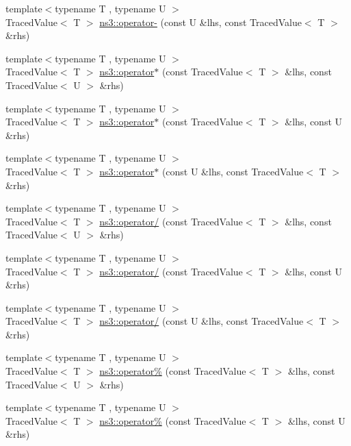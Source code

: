 \begin{DoxyCompactItemize}
\item 
{\footnotesize template$<$typename T , typename U $>$ }\\Traced\+Value$<$ T $>$ \hyperlink{group__tracing_gafaf9fc8dc508b1c51a5be851fb6aca0b}{ns3\+::operator-\/} (const U \&lhs, const Traced\+Value$<$ T $>$ \&rhs)
\item 
{\footnotesize template$<$typename T , typename U $>$ }\\Traced\+Value$<$ T $>$ \hyperlink{group__tracing_ga849d6e45a8026bcd4579e0700ce015ef}{ns3\+::operator$\ast$} (const Traced\+Value$<$ T $>$ \&lhs, const Traced\+Value$<$ U $>$ \&rhs)
\item 
{\footnotesize template$<$typename T , typename U $>$ }\\Traced\+Value$<$ T $>$ \hyperlink{group__tracing_ga735b4d1ce5c08bc715107f07ed933644}{ns3\+::operator$\ast$} (const Traced\+Value$<$ T $>$ \&lhs, const U \&rhs)
\item 
{\footnotesize template$<$typename T , typename U $>$ }\\Traced\+Value$<$ T $>$ \hyperlink{group__tracing_gac1cbedda6a22e93b898cc5b39e39e8da}{ns3\+::operator$\ast$} (const U \&lhs, const Traced\+Value$<$ T $>$ \&rhs)
\item 
{\footnotesize template$<$typename T , typename U $>$ }\\Traced\+Value$<$ T $>$ \hyperlink{group__tracing_ga5aa99ab0ba1592361e452c73ed91bc52}{ns3\+::operator/} (const Traced\+Value$<$ T $>$ \&lhs, const Traced\+Value$<$ U $>$ \&rhs)
\item 
{\footnotesize template$<$typename T , typename U $>$ }\\Traced\+Value$<$ T $>$ \hyperlink{group__tracing_ga22c4905dee035bcbbf03190562a01bca}{ns3\+::operator/} (const Traced\+Value$<$ T $>$ \&lhs, const U \&rhs)
\item 
{\footnotesize template$<$typename T , typename U $>$ }\\Traced\+Value$<$ T $>$ \hyperlink{group__tracing_ga20d493bf5e7b5d846f8dd3523656e2f2}{ns3\+::operator/} (const U \&lhs, const Traced\+Value$<$ T $>$ \&rhs)
\item 
{\footnotesize template$<$typename T , typename U $>$ }\\Traced\+Value$<$ T $>$ \hyperlink{group__tracing_ga9c7af7eff88594d6a21e1639c9178e32}{ns3\+::operator\%} (const Traced\+Value$<$ T $>$ \&lhs, const Traced\+Value$<$ U $>$ \&rhs)
\item 
{\footnotesize template$<$typename T , typename U $>$ }\\Traced\+Value$<$ T $>$ \hyperlink{group__tracing_ga885007c6a30f0c682373cd46119700c2}{ns3\+::operator\%} (const Traced\+Value$<$ T $>$ \&lhs, const U \&rhs)

\end{DoxyCompactItemize}
